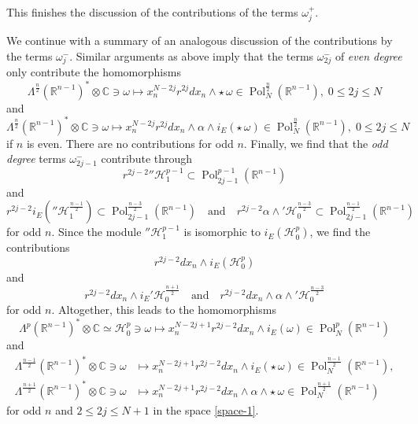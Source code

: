 \documentclass[a4paper,12pt,reqno]{amsart}
\numberwithin{theorem}{subsection}
\numberwithin{equation}{section}
\begin{document}
This finishes the discussion of the contributions of the terms $\omega_j^+$.

We continue with a summary of an analogous discussion of the contributions by
the terms $\omega_j^-$. Similar arguments as above imply that the terms
$\omega_{2j}^-$ of {\em even degree} only contribute the homomorphisms
\begin{equation}\label{exotic-3}
   \Lambda^\frac{n}{2}({\mathbb{R}}^{n-1})^* \otimes {\mathbb{C}} \ni \omega \mapsto x_n^{N-2j} r^{2j} dx_n \wedge \star \,
   \omega \in {\operatorname{Pol}}_N^{\frac{n}{2}}({\mathbb{R}}^{n-1}), \;  0 \le 2j \le N
\end{equation}
and
\begin{equation}\label{exotic-4}
   \Lambda^\frac{n}{2}({\mathbb{R}}^{n-1})^* \otimes {\mathbb{C}} \ni \omega \mapsto x_n^{N-2j} r^{2j} dx_n \wedge \alpha \wedge
   i_E (\star \, \omega) \in {\operatorname{Pol}}_N^{\frac{n}{2}}({\mathbb{R}}^{n-1}), \; 0 \le 2j \le N
\end{equation}
if $n$ is even. There are no contributions for odd $n$. Finally, we find that
the {\em odd degree} terms $\omega_{2j-1}^-$ contribute through
$$
   r^{2j-2} {''{\mathcal H}}_1^{p-1} \subset {\operatorname{Pol}}_{2j-1}^{p-1}({\mathbb{R}}^{n-1})
$$
and
$$
   r^{2j-2} i_E ({''{\mathcal H}}_1^{\frac{n-1}{2}}) \subset
   {\operatorname{Pol}}_{2j-1}^{\frac{n-3}{2}}({\mathbb{R}}^{n-1}) \quad \mbox{and} \quad
   r^{2j-2} \alpha \wedge {'{\mathcal H}}_0^{\frac{n-3}{2}} \subset
   {\operatorname{Pol}}_{2j-1}^{\frac{n-1}{2}}({\mathbb{R}}^{n-1})
$$
for odd $n$. Since the module ${''{\mathcal H}}_1^{p-1}$ is isomorphic to $i_E
({\mathcal H}_0^p)$, we find the contributions
$$
   r^{2j-2} dx_n \wedge i_E ({\mathcal H}_0^p)
$$
and
$$
   r^{2j-2} dx_n \wedge i_E {'{\mathcal H}}_0^{\frac{n+1}{2}}
   \quad \mbox{and} \quad
   r^{2j-2} dx_n \wedge \alpha \wedge {'{\mathcal H}}_0^{\frac{n-3}{2}}
$$
for odd $n$. Altogether, this leads to the homomorphisms
\begin{equation}\label{type-1-pp3}
    \Lambda^p({\mathbb{R}}^{n-1})^* \otimes {\mathbb{C}} \simeq {\mathcal H}_0^p  \ni \omega
    \mapsto x_n^{N-2j+1} r^{2j-2} dx_n \wedge i_E(\omega) \in {\operatorname{Pol}}_N^p({\mathbb{R}}^{n-1})
\end{equation}
and
\begin{align}
    \Lambda^{\frac{n-1}{2}}({\mathbb{R}}^{n-1})^* \otimes {\mathbb{C}} \ni \omega
    & \mapsto x_n^{N-2j+1} r^{2j-2} dx_n \wedge i_E (\star \, \omega) \in
    {\operatorname{Pol}}^{\frac{n-1}{2}}_N({\mathbb{R}}^{n-1}), \label{exotic-5} \\
    \Lambda^{\frac{n+1}{2}}({\mathbb{R}}^{n-1})^* \otimes {\mathbb{C}} \ni \omega
    & \mapsto x_n^{N-2j+1} r^{2j-2} dx_n \wedge \alpha \wedge \star \, \omega \in
    {\operatorname{Pol}}^{\frac{n+1}{2}}_N({\mathbb{R}}^{n-1}) \label{exotic-6}
\end{align}
for odd $n$ and $2 \le 2j \le N+1$ in the space \eqref{space-1}.
\end{document}
